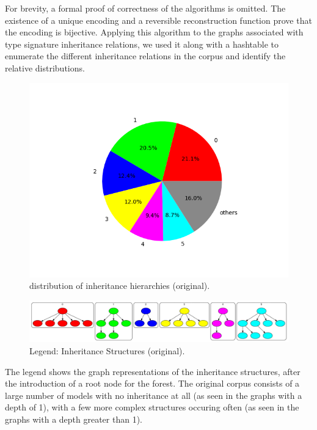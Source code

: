 \documentclass[conference]{IEEEtran}
\begin{document}
For brevity, a formal proof of correctness of the algorithms is omitted. The existence of a unique encoding and a reversible reconstruction function prove that the encoding is bijective. Applying this algorithm to the graphs associated with type signature inheritance relations, we used it along with a hashtable to enumerate the different inheritance relations in the corpus and identify the relative distributions.


\begin{figure}[htbp]
    \centerline{\includegraphics[width=\linewidth]{"./distribution of inheritance hierarchies (original).png"}}
    \caption{distribution of inheritance hierarchies (original).}
    \label{fig}
    \end{figure}

    \begin{figure}[htbp]
        \centerline{\includegraphics[width=\linewidth]{"./out/original.png"}}
        \caption{Legend: Inheritance Structures (original).}
        \label{fig}
        \end{figure}


The legend shows the graph representations of the inheritance structures, after the introduction of a root node for the forest. The original corpus consists of a large number of models with no inheritance at all (as seen in the graphs with a depth of 1), with a few more complex structures occuring often (as seen in the graphs with a depth greater than 1).
    
\end{document}
